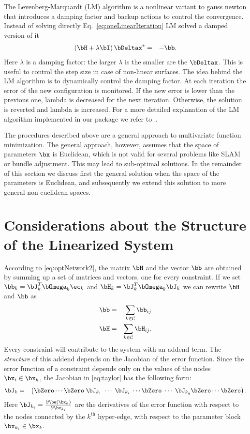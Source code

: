 \documentclass[a4paper]{article}
\begin{document}
The Levenberg-Marquardt (LM) algorithm is a nonlinear variant to gauss newton that introduces 
a damping factor and backup actions to control the convergence.
Instead of solving directly Eq.~\ref{eq:oneLinearIteration}
LM solved a damped version of it
\begin{eqnarray}
       (\bH +\lambda \bI)\,\bDeltax^* &=& - \bb. 
\label{eq:oneLinearIterationLevenberg}
\end{eqnarray}
Here $\lambda$ is a damping factor: the larger $\lambda$ is the
smaller are the $\bDeltax$. This is useful to control the step size in
case of non-linear surfaces.  The idea behind the LM algorithm is to
dynamically control the damping factor.  At each iteration the error
of the new configuration is monitored.  If the new error is lower than
the previous one, lambda is decreased for the next iteration.
Otherwise, the solution is reverted and lambda is increased.
For a more detailed explanation of the LM algorithm implemented in our package
we refer to~\cite{lourakis2009toms}.

The procedures described above are a general approach to multivariate
function minimization. The general approach, however, assumes that the
space of parameters $\bx$ is Euclidean, which is not valid for several
problems like SLAM or bundle adjustment. This may lead to sub-optimal
solutions. In the remainder of this section we discuss first the
general solution when the space of the parameters is Euclidean, and
subsequently we extend this solution to more general non-euclidean
spaces.

\section{Considerations about the Structure of the Linearized System}
According to \eqref{eq:optNetwork2}, the matrix $\bH$ and the vector
$\bb$ are obtained by summing up a set of matrices and vectors, one
for every constraint.  If we set $\bb_{k}=\bJ_{k}^T \bOmega_{k}
\ec_{k}$ and $\bH_{k}= \bJ_{k}^T \bOmega_{k}\bJ_{k}$ we can
rewrite $\bH$ and $\bb$ as
\begin{eqnarray}
  \bb&=&\sum_{k \in\mathcal{C}} \bb_{ij}\\ 
  \bH&=&\sum_{k \in\mathcal{C}} \bH_{ij}. \label{eq:addendTerm}
\end{eqnarray}
Every constraint will contribute to the system with an addend
term. The \emph{structure} of this addend depends on the Jacobian of
the error function.  Since the error function of a constraint depends
only on the values of the nodes $\bx_i \in \bx_k$, the Jacobian in
\eqref{eq:taylor} has the following form:
\begin{eqnarray}
\bJ_{k} &=& \left(\bZero \cdots \bZero \; \bJ_{k_1} \; \cdots \; \bJ_{k_i} \;\cdots \bZero\; \cdots\;  \bJ_{k_q} \bZero \cdots \bZero \right).
\label{eq:jacExpanded}
\end{eqnarray}
Here $\bJ_{k_i}= \frac{\partial \be(\bx_k)}{\partial \bx_{k_i}}$ are the
derivatives of the error function with respect to the nodes connected
by the $k^\mathrm{th}$ hyper-edge, with respect to the parameter block
$\bx_{k_i} \in \bx_k$.
\end{document}

